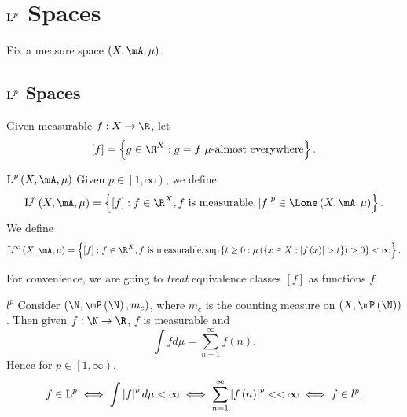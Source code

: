 \documentclass[pmath451]{subfiles}
\begin{document}
    \section{$\operatorname{L}^p$ Spaces}

    Fix a measure space $\left( X,\mA,\mu \right)$.

    \subsection{$\operatorname{L}^p$ Spaces}

    Given measurable $f:X\to\R$, let
    \begin{equation*}
        \left[ f \right] = \left\lbrace g\in\R^{X} : g=f\text{ $\mu$-almost everywhere} \right\rbrace.
    \end{equation*}

    \begin{definition}{$\LLL^p\left( X,\mA,\mu \right)$}
        Given $p\in\left[ 1,\infty \right)$, we define
        \begin{equation*}
            \LLL^p\left( X,\mA,\mu \right) = \left\lbrace \left[ f \right] : f\in\R^{X}, f\text{ is measurable}, \left| f \right|^p\in\Lone\left( X,\mA,\mu \right) \right\rbrace.
        \end{equation*}
        We define
        \begin{equation*}
            \LLL^{\infty}\left( X,\mA,\mu \right) = \left\lbrace \left[ f \right] : f\in\R^X, f\text{ is measurable}, \sup\left\lbrace t\geq 0 : \mu\left( \left\lbrace x\in X: \left| f\left( x \right) \right|>t \right\rbrace \right) > 0 \right\rbrace < \infty \right\rbrace.
        \end{equation*}
    \end{definition}

    \np For convenience, we are going to \textit{treat} equivalence classes $\left[ f \right]$ as functions $f$.

    \begin{example}{$l^p$}
        Consider $\left( \N,\mP\left( \N \right), m_c \right)$, where $m_c$ is the counting measure on $\left( X,\mP\left( \N \right) \right)$. Then given $f:\N\to\R$, $f$ is measurable and
        \begin{equation*}
            \int fd\mu = \sum^{\infty}_{n=1} f\left( n \right).
        \end{equation*}
        Hence for $p\in\left[ 1,\infty \right)$,
        \begin{equation*}
            f\in\operatorname{L}^p \iff \int\left| f \right|^p d\mu < \infty \iff \sum^{\infty}_{n=1} \left| f\left( n \right) \right|^p << \infty \iff f\in l^p.
        \end{equation*}
    \end{example}
    
\end{document}
